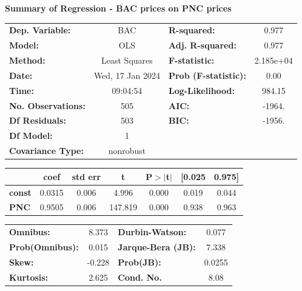 \documentclass[a4paper, 11pt]{article}
\begin{document}
\begin{enumerate}[A.]
\textbf{Summary of Regression - BAC prices on PNC prices} 
\begin{center}
\begin{tabular}{lclc}
\toprule
\textbf{Dep. Variable:}    &       BAC        & \textbf{  R-squared:         } &     0.977   \\
\textbf{Model:}            &       OLS        & \textbf{  Adj. R-squared:    } &     0.977   \\
\textbf{Method:}           &  Least Squares   & \textbf{  F-statistic:       } & 2.185e+04   \\
\textbf{Date:}             & Wed, 17 Jan 2024 & \textbf{  Prob (F-statistic):} &     0.00    \\
\textbf{Time:}             &     09:04:54     & \textbf{  Log-Likelihood:    } &    984.15   \\
\textbf{No. Observations:} &         505      & \textbf{  AIC:               } &    -1964.   \\
\textbf{Df Residuals:}     &         503      & \textbf{  BIC:               } &    -1956.   \\
\textbf{Df Model:}         &           1      & \textbf{                     } &             \\
\textbf{Covariance Type:}  &    nonrobust     & \textbf{                     } &             \\
\bottomrule
\end{tabular}
\begin{tabular}{lcccccc}
               & \textbf{coef} & \textbf{std err} & \textbf{t} & \textbf{P$> |$t$|$} & \textbf{[0.025} & \textbf{0.975]}  \\
\midrule
\textbf{const} &       0.0315  &        0.006     &     4.996  &         0.000        &        0.019    &        0.044     \\
\textbf{PNC}   &       0.9505  &        0.006     &   147.819  &         0.000        &        0.938    &        0.963     \\
\bottomrule
\end{tabular}
\begin{tabular}{lclc}
\textbf{Omnibus:}       &  8.373 & \textbf{  Durbin-Watson:     } &    0.077  \\
\textbf{Prob(Omnibus):} &  0.015 & \textbf{  Jarque-Bera (JB):  } &    7.338  \\
\textbf{Skew:}          & -0.228 & \textbf{  Prob(JB):          } &   0.0255  \\
\textbf{Kurtosis:}      &  2.625 & \textbf{  Cond. No.          } &     8.08  \\
\bottomrule
\end{tabular}
\end{center}


\end{enumerate}
\end{document}
